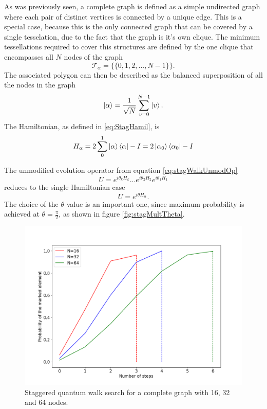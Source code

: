 \documentclass[../../dissertation.tex]{subfiles}
\begin{document}
As was previously seen, a complete graph is defined as a simple undirected
graph where each pair of distinct vertices is connected by a unique edge.  This
is a special case, because this is the only connected graph that can be covered
by a single tesselation, due to the fact that the graph is it's own clique. The
minimum tessellations required to cover this structures are defined by the one
clique that encompasses all $N$ nodes of the graph
\begin{equation}
	\mathscr{T}_{\alpha} = \{\{0,1,2,...,N-1\}\}.
\end{equation}
The associated polygon can then be described as the balanced superposition of
all the nodes in the graph
\begin{equation}
	\ket{\alpha} = \frac{1}{\sqrt{N}} \sum_{v=0}^{N-1} \ket{v}.
\end{equation}
The Hamiltonian, as defined in \ref{eq:StagHamil}, is 
\begin{equation}
	H_\alpha = 2\sum_0^1\ket{\alpha}\bra{\alpha} - I = 2\ket{\alpha_0}\bra{\alpha_0} - I
\end{equation}\par
The unmodified evolution operator from equation \ref{eq:stagWalkUnmodOp}
\begin{equation}
	U = e^{i\theta_{k}H_{k}}...e^{i\theta_{2}H_{2}}e^{i\theta_{1}H_{1}}
\end{equation}
reduces to the single Hamiltonian case
\begin{equation}
	U = e^{i\theta H_\alpha}.
	\label{eq:stagQWSearchUnmodEvo1}
\end{equation}
The choice of the $\theta$ value is an important one, since maximum probability
is achieved at $\theta = \frac{\pi}{2}$, as shown in figure
\ref{fig:stagMultTheta}.
\begin{figure}[!h]
	\centering
	\includegraphics[scale=0.40]{img/StagQuantumWalk/Search/163264.png}
	\caption{Staggered quantum walk search for a complete graph with 16, 32 and 64 nodes.}
	\label{fig:StagSearch}
\end{figure}\par
\end{document}
